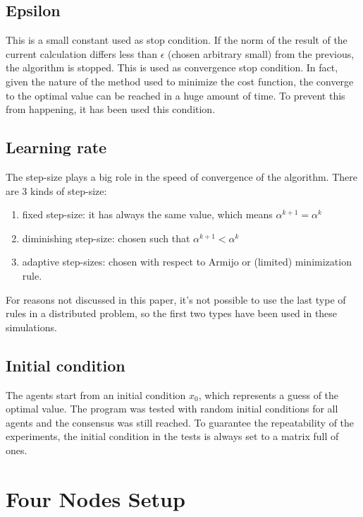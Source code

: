 \documentclass[a4paper,11pt,oneside]{book}
\begin{document}
\subsection{Epsilon} \label{Subsec2.2.2}
This is a small constant used as stop condition. If the norm of the result of the current calculation differs less than $\epsilon$ (chosen arbitrary small) from the previous, the algorithm is stopped. This is used as convergence stop condition. In fact, given the nature of the method used to minimize the cost function, the converge to the optimal value can be reached in a huge amount of time. To prevent this from happening, it has been used this condition.

\subsection{Learning rate} \label{Subsec2.2.3}
The step-size plays a big role in the speed of convergence of the algorithm. There are 3 kinds of step-size:
\begin{enumerate}
	\item fixed step-size: it has always the same value, which means $\alpha^{k+1} = \alpha^k$
	\item diminishing step-size: chosen such that $\alpha^{k+1} < \alpha^k$
	\item adaptive step-sizes: chosen with respect to Armijo or (limited) minimization rule.
\end{enumerate}
For reasons not discussed in this paper, it's not possible to use the last type of rules in a distributed problem, so the first two types have been used in these simulations.

\subsection{Initial condition} \label{Subsec2.2.4}
The agents start from an initial condition $x_0$, which represents a guess of the optimal value. The program was tested with random initial conditions for all agents and the consensus was still reached. To guarantee the repeatability of the experiments, the initial condition in the tests is always set to a matrix full of ones.

\section{Four Nodes Setup} \label{Sec2.2}
\end{document}
